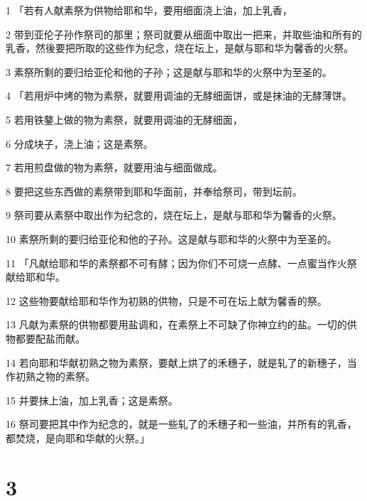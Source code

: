 \par 1 「若有人献素祭为供物给耶和华，要用细面浇上油，加上乳香，
\par 2 带到亚伦子孙作祭司的那里；祭司就要从细面中取出一把来，并取些油和所有的乳香，然後要把所取的这些作为纪念，烧在坛上，是献与耶和华为馨香的火祭。
\par 3 素祭所剩的要归给亚伦和他的子孙；这是献与耶和华的火祭中为至圣的。
\par 4 「若用炉中烤的物为素祭，就要用调油的无酵细面饼，或是抹油的无酵薄饼。
\par 5 若用铁鏊上做的物为素祭，就要用调油的无酵细面，
\par 6 分成块子，浇上油；这是素祭。
\par 7 若用煎盘做的物为素祭，就要用油与细面做成。
\par 8 要把这些东西做的素祭带到耶和华面前，并奉给祭司，带到坛前。
\par 9 祭司要从素祭中取出作为纪念的，烧在坛上，是献与耶和华为馨香的火祭。
\par 10 素祭所剩的要归给亚伦和他的子孙。这是献与耶和华的火祭中为至圣的。
\par 11 「凡献给耶和华的素祭都不可有酵；因为你们不可烧一点酵、一点蜜当作火祭献给耶和华。
\par 12 这些物要献给耶和华作为初熟的供物，只是不可在坛上献为馨香的祭。
\par 13 凡献为素祭的供物都要用盐调和，在素祭上不可缺了你神立约的盐。一切的供物都要配盐而献。
\par 14 若向耶和华献初熟之物为素祭，要献上烘了的禾穗子，就是轧了的新穗子，当作初熟之物的素祭。
\par 15 并要抹上油，加上乳香；这是素祭。
\par 16 祭司要把其中作为纪念的，就是一些轧了的禾穗子和一些油，并所有的乳香，都焚烧，是向耶和华献的火祭。」

\chapter{3}


